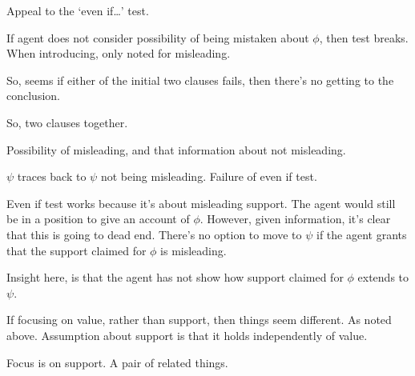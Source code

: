 \begin{note}
  Appeal to the `even if\dots' test.

  If agent does not consider possibility of being mistaken about \(\phi\), then test breaks.
  When introducing, only noted for misleading.
\end{note}

\begin{note}
  So, seems if either of the initial two clauses fails, then there's no getting to the conclusion.
\end{note}

\begin{note}
  So, two clauses together.

  Possibility of misleading, and that information about not misleading.

  \(\psi\) traces back to \(\psi\) not being misleading.
  Failure of even if test.

  Even if test works because it's about misleading support.
  The agent would still be in a position to give an account of \(\phi\).
  However, given information, it's clear that this is going to dead end.
  There's no option to move to \(\psi\) if the agent grants that the support claimed for \(\phi\) is misleading.

  Insight here, is that the agent has not show how support claimed for \(\phi\) extends to \(\psi\).
\end{note}

\begin{note}
  If focusing on value, rather than support, then things seem  different.
  As noted above.
  Assumption about support is that it holds independently of value.
\end{note}




\begin{note}
  Focus is on support.
  A pair of related things.
\end{note}

